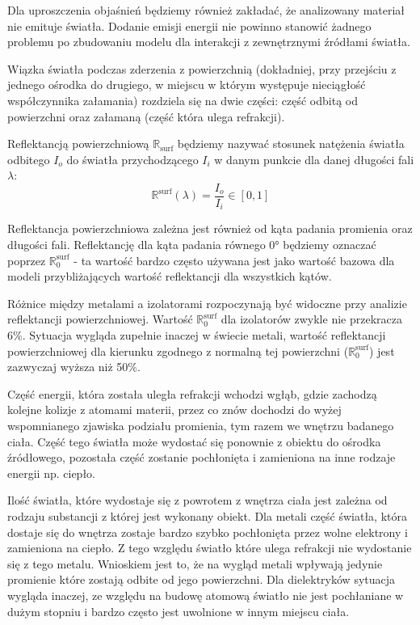 \documentclass[../main.tex]{subfiles}
\begin{document}
Dla uproszczenia objaśnień będziemy również zakładać, że analizowany materiał nie emituje światła. Dodanie emisji energii nie powinno stanowić żadnego problemu po zbudowaniu modelu dla interakcji z zewnętrznymi źródłami światła.

Wiązka światła podczas zderzenia z powierzchnią (dokładniej, przy przejściu z jednego ośrodka do drugiego, w miejscu w którym występuje nieciągłość współczynnika załamania) rozdziela się na dwie części: część odbitą od powierzchni oraz załamaną (część która ulega refrakcji).

Reflektancją powierzchniową $\mathbb{R}_{\text{surf}}$ \cite{pbr_games_siggraph} będziemy nazywać stosunek natężenia światła odbitego $I_o$ do światła przychodzącego $I_i$ w danym punkcie dla danej długości fali $\lambda$:
\[
	\mathbb{R}^{\text{surf}}(\lambda) = \frac{
        I_o
    }{
        I_i
    } \in \left[
        0, 1 
    \right]
\]

Reflektancja powierzchniowa zależna jest również od kąta padania promienia oraz długości fali. Reflektancję dla kąta padania równego $\ang{0}$ będziemy oznaczać poprzez $\mathbb{R}^{\text{surf}}_{0}$ - ta wartość bardzo często używana jest jako wartość bazowa dla modeli przybliżających wartość reflektancji dla wszystkich kątów. 

Różnice między metalami a izolatorami rozpoczynają być widoczne przy analizie reflektancji powierzchniowej. Wartość $\mathbb{R}^{\text{surf}}_{0}$ dla izolatorów zwykle nie przekracza 6\%. Sytuacja wygląda zupełnie inaczej w świecie metali, wartość reflektancji powierzchniowej dla kierunku zgodnego z normalną tej powierzchni ($\mathbb{R}^{\text{surf}}_{0}$) jest zazwyczaj wyższa niż 50\%.

Część energii, która została uległa refrakcji wchodzi wgłąb, gdzie zachodzą kolejne kolizje z atomami materii, przez co znów dochodzi do wyżej wspomnianego zjawiska podziału promienia, tym razem we wnętrzu badanego ciała. Część tego światła może wydostać się ponownie z obiektu do ośrodka źródłowego, pozostała część zostanie pochłonięta i zamieniona na inne rodzaje energii np. ciepło.

Ilość światła, które wydostaje się z powrotem z wnętrza ciała jest zależna od rodzaju substancji z której jest wykonany obiekt. Dla metali część światła, która dostaje się do wnętrza zostaje bardzo szybko pochłonięta przez wolne elektrony i zamieniona na ciepło. Z tego względu światło które ulega refrakcji nie wydostanie się z tego metalu. Wnioskiem jest to, że na wygląd metali wpływają jedynie promienie które zostają odbite od jego powierzchni. Dla dielektryków sytuacja wygląda inaczej, ze względu na budowę atomową światło nie jest pochłaniane w dużym stopniu i bardzo często jest uwolnione w innym miejscu ciała.
\end{document}
